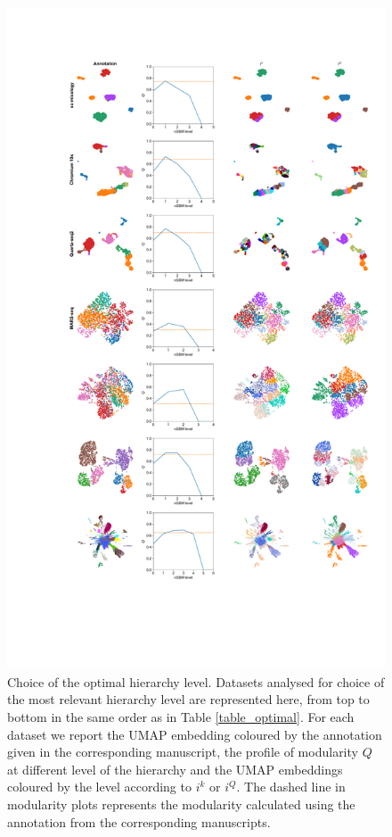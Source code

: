 \documentclass[11pt, titlepage, twoside]{article}
\begin{document}
\begin{figure}[htbp]
\centering
\includegraphics[keepaspectratio,width=1\textwidth,height=\textheight]{FigureOptimalLevel.pdf}
\vspace*{-80pt}
\caption[]{Choice of the optimal hierarchy level. Datasets analysed for choice of the most relevant hierarchy level are represented here, from top to bottom in the same order as in Table \ref{table_optimal}. For each dataset we report the UMAP embedding coloured by the annotation given in the corresponding manuscript, the profile of modularity $Q$ at different level of the hierarchy and the UMAP embeddings coloured by the level according to $i^k$ or $i^Q$. The dashed line in modularity plots represents the modularity calculated using the annotation from the corresponding manuscripts.}\label{FigureOptimalLevel}
\end{figure}
\end{document}
